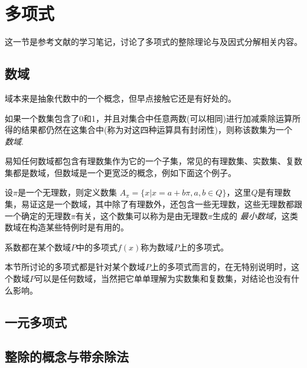 
\section{多项式}
\label{sec:polynome}

这一节是参考文献\cite{advanced-algebra}的学习笔记，讨论了多项式的整除理论与及因式分解相关内容。

\subsection{数域}
\label{sec:number-field}

域本来是抽象代数中的一个概念，但早点接触它还是有好处的。

\begin{definition}
  如果一个数集包含了0和1，并且对集合中任意两数(可以相同)进行加减乘除运算所得的结果都仍然在这集合中(称为对这四种运算具有封闭性)，则称该数集为一个 \emph{数域}.
\end{definition}

易知任何数域都包含有理数集作为它的一个子集，常见的有理数集、实数集、复数集都是数域，但数域是一个更宽泛的概念，例如下面这个例子。

\begin{example}
  设$\pi$是一个无理数，则定义数集 $A_{\pi} = \{x|x=a+b\pi,a,b\in Q\}$，这里$Q$是有理数集，易证这是一个数域，其中除了有理数外，还包含一些无理数，这些无理数都跟一个确定的无理数$\pi$有关，这个数集可以称为是由无理数$\pi$生成的 \emph{最小数域}，这类数域在构造某些特例时是有用的。
\end{example}

\begin{definition}
  系数都在某个数域$P$中的多项式$f(x)$称为数域$P$上的多项式。
\end{definition}

本节所讨论的多项式都是针对某个数域$P$上的多项式而言的，在无特别说明时，这个数域$P$可以是任何数域，当然把它单单理解为实数集和复数集，对结论也没有什么影响。

\subsection{一元多项式}
\label{sec:polynome-with-one-variable}

\subsection{整除的概念与带余除法}
\label{sec:polynome-integer-division-and-devision-with-remainder}

